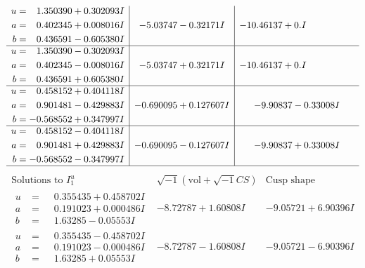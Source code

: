 \documentclass[1p]{elsarticle_modified}
\theoremstyle{definition}
\newcommand{\I}{\sqrt{-1}}
\begin{document}
$$\begin{array}{c|c|c}
\begin{aligned}
u &= \phantom{-}1.350390 + 0.302093 I \\
a &= \phantom{-}0.402345 + 0.008016 I \\
b &= \phantom{-}0.436591 - 0.605380 I\end{aligned}
 & -5.03747 - 0.32171 I & -10.46137 + 0. I\phantom{ +0.000000I} \\ \hline\begin{aligned}
u &= \phantom{-}1.350390 - 0.302093 I \\
a &= \phantom{-}0.402345 - 0.008016 I \\
b &= \phantom{-}0.436591 + 0.605380 I\end{aligned}
 & -5.03747 + 0.32171 I & -10.46137 + 0. I\phantom{ +0.000000I} \\ \hline\begin{aligned}
u &= \phantom{-}0.458152 + 0.404118 I \\
a &= \phantom{-}0.901481 - 0.429883 I \\
b &= -0.568552 + 0.347997 I\end{aligned}
 & -0.690095 + 0.127607 I & -9.90837 - 0.33008 I \\ \hline\begin{aligned}
u &= \phantom{-}0.458152 - 0.404118 I \\
a &= \phantom{-}0.901481 + 0.429883 I \\
b &= -0.568552 - 0.347997 I\end{aligned}
 & -0.690095 - 0.127607 I & -9.90837 + 0.33008 I\\
 \hline 
 \end{array}$$\newpage$$\begin{array}{c|c|c}  
\text{Solutions to }I^u_{1}& \I (\text{vol} + \sqrt{-1}CS) & \text{Cusp shape}\\
 \hline 
\begin{aligned}
u &= \phantom{-}0.355435 + 0.458702 I \\
a &= \phantom{-}0.191023 + 0.000486 I \\
b &= \phantom{-}1.63285 - 0.05553 I\end{aligned}
 & -8.72787 + 1.60808 I & -9.05721 + 6.90396 I \\ \hline\begin{aligned}
u &= \phantom{-}0.355435 - 0.458702 I \\
a &= \phantom{-}0.191023 - 0.000486 I \\
b &= \phantom{-}1.63285 + 0.05553 I\end{aligned}
 & -8.72787 - 1.60808 I & -9.05721 - 6.90396 I \\ \hline\begin{aligned}

\end{aligned}
\end{array}$$
\end{document}
